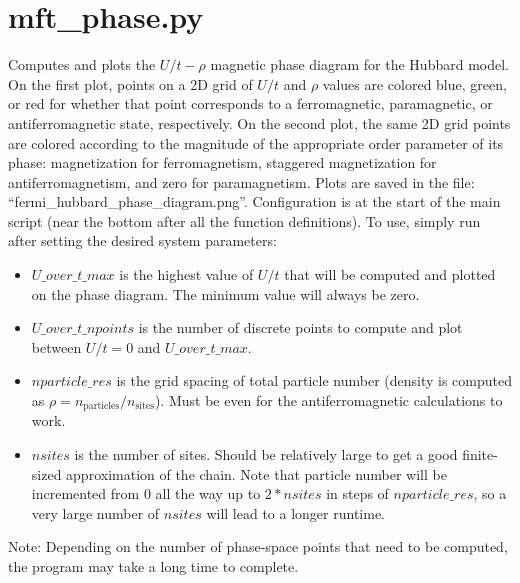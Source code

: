 \documentclass{article}
\newcommand{\p}{\newline\newline}		%
\begin{document}
\section{mft\_phase.py}
Computes and plots the $U/t-\rho$ magnetic phase diagram for the Hubbard model. On the first plot, points on a 2D grid of $U/t$ and $\rho$ values are colored blue, green, or red for whether that point corresponds to a ferromagnetic, paramagnetic, or antiferromagnetic state, respectively. On the second plot, the same 2D grid points are colored according to the magnitude of the appropriate order parameter of its phase: magnetization for ferromagnetism, staggered magnetization for antiferromagnetism, and zero for paramagnetism.
\p
Plots are saved in the file: ``fermi\_hubbard\_phase\_diagram.png''.
\p
Configuration is at the start of the main script (near the bottom after all the function definitions). To use, simply run after setting the desired system parameters:
\begin{itemize}
\item $U\_over\_t\_max$ is the highest value of $U/t$ that will be computed and plotted on the phase diagram. The minimum value will always be zero.
\item $U\_over\_t\_npoints$ is the number of discrete points to compute and plot between $U/t = 0$ and $U\_over\_t\_max$.
\item $nparticle\_res$ is the grid spacing of total particle number (density is computed as $\rho = n_{\text{particles}} / n_{\text{sites}}$). Must be even for the antiferromagnetic calculations to work.
\item $nsites$ is the number of sites. Should be relatively large to get a good finite-sized approximation of the chain. Note that particle number will be incremented from $0$ all the way up to $2*nsites$ in steps of $nparticle\_res$, so a very large number of $nsites$ will lead to a longer runtime.
\end{itemize}
Note: Depending on the number of phase-space points that need to be computed, the program may take a long time to complete.
\end{document}

